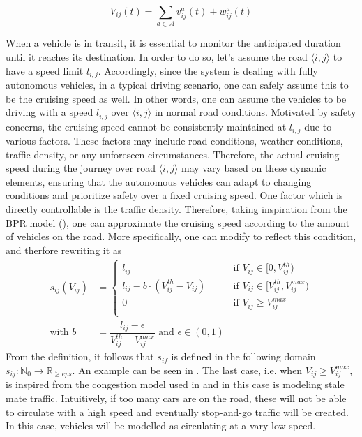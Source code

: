 \begin{equation}
	V_{ij}(t) = \sum_{a \in \mathcal{A}} v^{a}_{ij}(t) +w^{a}_{ij}(t)
	\label{eq:vehicles_on_street}
\end{equation}

When a vehicle is in transit, it is essential to monitor the anticipated duration until it reaches its destination. In order to do so, let's assume the road $\langle i,j\rangle$ to have a speed limit $l_{i,j}$. Accordingly, since the system is dealing with fully autonomous vehicles, in a typical driving scenario, one can safely assume this to be the cruising speed as well. In other words, one can assume the vehicles to be driving with a speed $l_{i,j}$ over $\langle i,j\rangle$ in normal road conditions.  Motivated by safety concerns, the cruising speed cannot be consistently maintained at $l_{i,j}$ due to various factors. These factors may include road conditions, weather conditions, traffic density, or any unforeseen circumstances. Therefore, the actual cruising speed during the journey over road $\langle i,j\rangle$ may vary based on these dynamic elements, ensuring that the autonomous vehicles can adapt to changing conditions and prioritize safety over a fixed cruising speed. One factor which is directly controllable is the traffic density. Therefore, taking inspiration from the BPR model (), one can approximate the cruising speed according to the amount of vehicles on the road. More specifically, one can modify  to reflect this condition, and therfore rewriting it as \\
\begin{equation}
	\begin{aligned}	
		s_{ij}(V_{ij}) &= \begin{cases}
			l_{ij} \quad\quad &\text{if } V_{ij}\in[0,V_{ij}^{th})\\ 
			l_{ij} - b\cdot(V_{ij}^{th}- V_{ij}) \quad\quad &\text{if }V_{ij}\in[V_{ij}^{th}, V_{ij}^{max})\\ 
			0\quad\quad &\text{if }V_{ij} \ge V_{ij}^{max}\\ 
		\end{cases}\\
		\text{with } b  &=  \dfrac{l_{ij}-\epsilon }{ V_{ij}^{th} -  V_{ij}^{max}} \text{ and } \epsilon \in (0,1)
\end{aligned}
	\label{eq:model_bpr_approximation2}
\end{equation}
From the definition, it follows that $s_{if}$ is defined in the following domain $s_{ij}: \mathbb{N}_0 \rightarrow \mathbb{R}_{\ge eps}$.
An example can be seen in . The last case, i.e. when $V_{ij} \ge V_{ij}^{max}$, is inspired from the congestion model used in  and in this case is modeling stale mate traffic. Intuitively, if too many cars are on the road, these will not be able to circulate with a high speed and eventually stop-and-go traffic will be created. In this case, vehicles will be modelled as circulating at a vary low speed. \\

